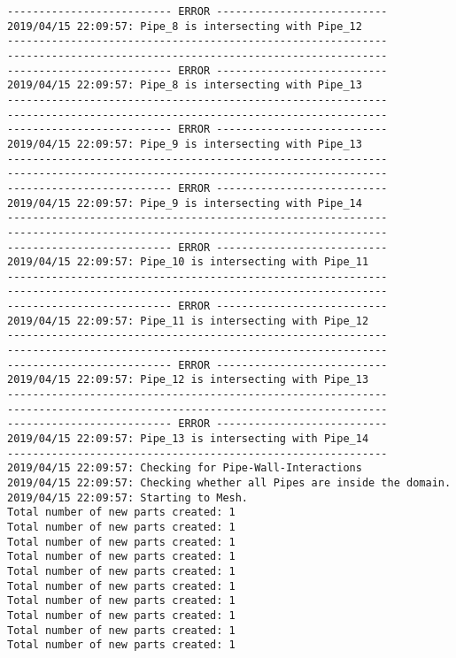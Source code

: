 \documentclass{article}
\begin{document}
{\begin{verbatim}
-------------------------- ERROR ---------------------------
2019/04/15 22:09:57: Pipe_8 is intersecting with Pipe_12
------------------------------------------------------------
------------------------------------------------------------
-------------------------- ERROR ---------------------------
2019/04/15 22:09:57: Pipe_8 is intersecting with Pipe_13
------------------------------------------------------------
------------------------------------------------------------
-------------------------- ERROR ---------------------------
2019/04/15 22:09:57: Pipe_9 is intersecting with Pipe_13
------------------------------------------------------------
------------------------------------------------------------
-------------------------- ERROR ---------------------------
2019/04/15 22:09:57: Pipe_9 is intersecting with Pipe_14
------------------------------------------------------------
------------------------------------------------------------
-------------------------- ERROR ---------------------------
2019/04/15 22:09:57: Pipe_10 is intersecting with Pipe_11
------------------------------------------------------------
------------------------------------------------------------
-------------------------- ERROR ---------------------------
2019/04/15 22:09:57: Pipe_11 is intersecting with Pipe_12
------------------------------------------------------------
------------------------------------------------------------
-------------------------- ERROR ---------------------------
2019/04/15 22:09:57: Pipe_12 is intersecting with Pipe_13
------------------------------------------------------------
------------------------------------------------------------
-------------------------- ERROR ---------------------------
2019/04/15 22:09:57: Pipe_13 is intersecting with Pipe_14
------------------------------------------------------------
2019/04/15 22:09:57: Checking for Pipe-Wall-Interactions
2019/04/15 22:09:57: Checking whether all Pipes are inside the domain.
2019/04/15 22:09:57: Starting to Mesh.
Total number of new parts created: 1
Total number of new parts created: 1
Total number of new parts created: 1
Total number of new parts created: 1
Total number of new parts created: 1
Total number of new parts created: 1
Total number of new parts created: 1
Total number of new parts created: 1
Total number of new parts created: 1
Total number of new parts created: 1
\end{verbatim}
}
\clearpage
\end{document}
